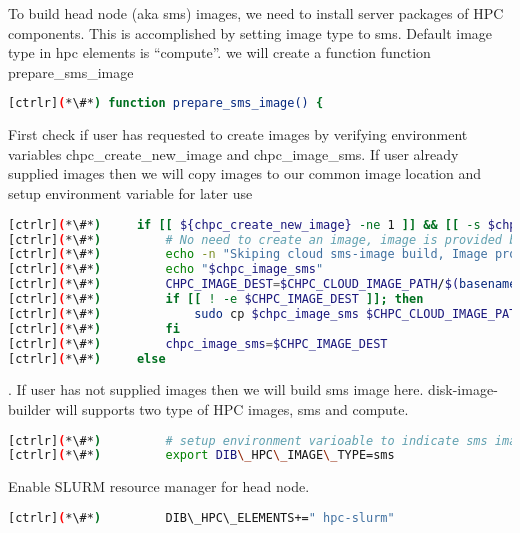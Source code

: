 To build head node (aka sms) images, we need to install server packages of HPC components. This is accomplished by setting image type to sms. Default image type in hpc elements is “compute”. we will create a function function prepare\_sms\_image

\begin{lstlisting}[language=bash,keywords={}]
[ctrlr](*\#*) function prepare_sms_image() {
\end{lstlisting} 

First check if user has requested to create images by verifying environment variables chpc\_create\_new\_image and chpc\_image\_sms. If user already supplied images then we will copy images to our common image location and setup environment variable for later use
\begin{lstlisting}[language=bash,keywords={}]
[ctrlr](*\#*)     if [[ ${chpc_create_new_image} -ne 1 ]] && [[ -s $chpc_image_sms ]]; then
[ctrlr](*\#*)         # No need to create an image, image is provided by user
[ctrlr](*\#*)         echo -n "Skiping cloud sms-image build, Image provided:"
[ctrlr](*\#*)         echo "$chpc_image_sms"
[ctrlr](*\#*)         CHPC_IMAGE_DEST=$CHPC_CLOUD_IMAGE_PATH/$(basename $chpc_image_sms)
[ctrlr](*\#*)         if [[ ! -e $CHPC_IMAGE_DEST ]]; then
[ctrlr](*\#*)             sudo cp $chpc_image_sms $CHPC_CLOUD_IMAGE_PATH
[ctrlr](*\#*)         fi
[ctrlr](*\#*)         chpc_image_sms=$CHPC_IMAGE_DEST
[ctrlr](*\#*)     else
\end{lstlisting} 

. If user has not supplied images then we will build sms image here. disk-image-builder will supports two type of HPC images, sms and compute.  

\begin{lstlisting}[language=bash,keywords={}]
[ctrlr](*\#*)         # setup environment varioable to indicate sms image type
[ctrlr](*\#*)         export DIB\_HPC\_IMAGE\_TYPE=sms
\end{lstlisting} 

Enable SLURM resource manager for head node.


\begin{lstlisting}[language=bash,keywords={}]
[ctrlr](*\#*)         DIB\_HPC\_ELEMENTS+=" hpc-slurm"
\end{lstlisting} 

